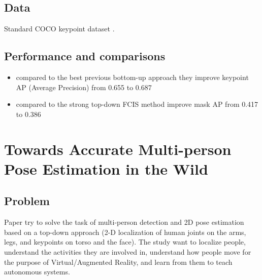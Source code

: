 \subsection{Data}
Standard COCO keypoint dataset \cite{coco2016}.

\subsection{Performance and comparisons}
\begin{itemize}
    \item compared to the best previous bottom-up approach they improve keypoint AP (Average Precision) from 0.655 to 0.687
    \item compared to the strong top-down FCIS method \cite{DBLP:journals/corr/LiQDJW16} improve mask AP from 0.417 to 0.386
\end{itemize}


\section{Towards Accurate Multi-person Pose Estimation in the Wild
\cite{DBLP:journals/corr/PapandreouZKTTB17}}

\subsection{Problem}
\par Paper try to solve the task of multi-person detection and 2D pose estimation based on a top-down approach (2-D localization of human joints on the arms, legs, and keypoints on torso and the face).
The study want to localize people, understand the activities they are involved in, understand how people move for the purpose of Virtual/Augmented Reality, and learn from them to teach autonomous systems.



